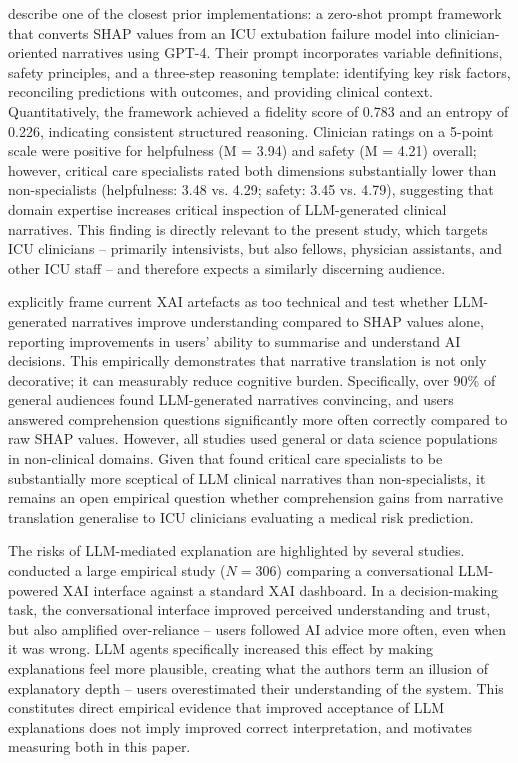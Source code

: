 \documentclass[12pt, a4paper]{article}
\begin{document}
\citet{lee2025prompt} describe one of the closest prior implementations: a
zero-shot prompt framework that converts SHAP values from an ICU extubation
failure model into clinician-oriented narratives using GPT-4. Their prompt
incorporates variable definitions, safety principles, and a three-step
reasoning template: identifying key risk factors, reconciling predictions with
outcomes, and providing clinical context. Quantitatively, the framework
achieved a fidelity score of 0.783 and an entropy of 0.226, indicating
consistent structured reasoning. Clinician ratings on a 5-point scale were
positive for helpfulness (M = 3.94) and safety (M = 4.21) overall; however,
critical care specialists rated both dimensions substantially lower than
non-specialists (helpfulness: 3.48 vs. 4.29; safety: 3.45 vs. 4.79),
suggesting that domain expertise increases critical inspection of LLM-generated
clinical narratives. This finding is directly relevant to the present study,
which targets ICU clinicians -- primarily intensivists, but also fellows,
physician assistants, and other ICU staff -- and therefore expects
a similarly discerning audience.

\citet{dams2025tell} explicitly frame current XAI artefacts as too technical
and test whether LLM-generated narratives improve
understanding compared to SHAP values alone, reporting improvements in users'
ability to summarise and understand AI decisions. This empirically demonstrates
that narrative translation is not only decorative; it can measurably reduce
cognitive burden. Specifically, over 90\% of general audiences found
LLM-generated narratives convincing, and users answered comprehension
questions significantly more often correctly compared to raw SHAP values.
However, all studies used general or data science populations in
non-clinical domains. Given that \citet{lee2025prompt} found critical care
specialists to be substantially more sceptical of LLM clinical narratives
than non-specialists, it remains an open empirical question whether
comprehension gains from narrative translation generalise to ICU clinicians
evaluating a medical risk prediction.

The risks of LLM-mediated explanation are highlighted by several studies.
\citet{he2025conversational} conducted a large empirical study ($N = 306$)
comparing a conversational LLM-powered XAI interface against a standard XAI
dashboard. In a decision-making task, the conversational interface improved
perceived understanding and trust, but also amplified over-reliance -- users
followed AI advice more often, even when it was wrong.
LLM agents specifically increased this effect by making explanations feel
more plausible, creating what the authors term an illusion of explanatory
depth -- users overestimated their understanding of the system. This
constitutes direct empirical evidence that improved acceptance of LLM
explanations does not imply improved correct interpretation, and motivates
measuring both in this paper.
\end{document}
